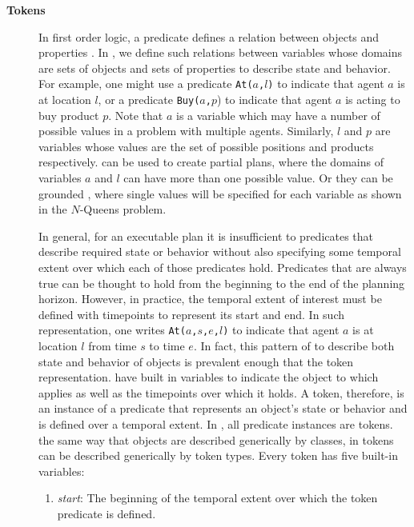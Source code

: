 \begin{description}
\item[\textbf{Tokens}] In first order logic, a predicate defines a
  relation between objects and properties \cite{gen87}.  In \eu, we
  define such relations between variables whose domains are sets of
  objects and sets of properties to describe state and behavior. For
  example, one might use a predicate \texttt{At($a$,$l$)} to indicate
  that agent $a$ is at location $l$, or a predicate
  \texttt{Buy($a$,$p$}) to indicate that agent $a$ is acting to buy
  product $p$. Note that $a$ is a variable which may have a number of
  possible values in a problem with multiple agents. Similarly, $l$
  and $p$ are variables whose values are the set of possible positions
  and products respectively. \eu can be used to create partial plans,
  where the domains of variables $a$ and $l$ can have more than one
  possible value. Or they can be grounded ,
  where single values will be specified for each variable as shown in
  the $N$-Queens problem.

  In general, for an executable plan it is insufficient to
   predicates that describe required state or
  behavior without also specifying some temporal extent over which
  each of those predicates hold. Predicates that are always true can
  be thought to hold from the beginning to the end of the planning
  horizon. However, in practice, the temporal extent of interest must
  be defined with timepoints to represent its start and end.  In such
   representation, one writes \texttt{At($a$,$s$,$e$,$l$)}
  to indicate that agent $a$ is at location $l$ from time $s$ to time
  $e$. In fact, this pattern of  to describe both
  state and behavior of objects is prevalent enough that \eu
   the token
  representation.  have built in variables to
  indicate the object to which  applies as well
  as the timepoints over which it holds. A token, therefore, is an
  instance of a predicate that represents an object's state or
  behavior and is defined over a temporal extent. In \eu, all
  predicate instances are tokens.  the same way that
  objects are described generically by classes, in \eu tokens can be
  described generically by token types. Every token has five built-in
  variables:

  \begin{enumerate}

  \item \textit {start}: The beginning of the temporal extent over
    which the token predicate is defined.


\end{enumerate}
\end{description}
